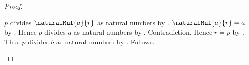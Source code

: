 \begin{proof}
\begin{byCase}
\begin{byCase}
                    \begin{byCase}
                            $p$ divides $\naturalMul{a}{r}$
                                as natural numbers
                                by .
                            $\naturalMul{a}{r}=a$ by
                                .
                            Hence $p$ divides $a$ as natural numbers
                                by \auto.
                            Contradiction.
                            Hence $r=p$ by \auto.
                            Thus $p$ divides $b$ as natural numbers
                                by \auto.
                            Follows.
                    \end{byCase}
            \end{byCase}
    \end{byCase}
\end{proof}
